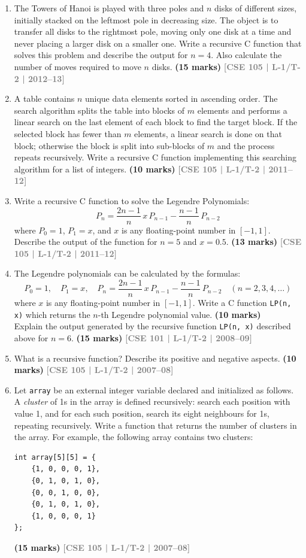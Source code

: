 \documentclass[12pt,a3paper]{article}
\newcommand{\yr}[1]{\hfill\textcolor{gray}{\small\textbf{[#1]}}}
\newcommand{\mk}[1]{\textcolor{orange!70!black}{\small\textbf{(#1 marks)}}}
\begin{document}
\begin{enumerate}
\item The Towers of Hanoi is played with three poles and $n$ disks of different sizes, initially stacked on the leftmost pole in decreasing size. The object is to transfer all disks to the rightmost pole, moving only one disk at a time and never placing a larger disk on a smaller one. Write a recursive C function that solves this problem and describe the output for $n = 4$. Also calculate the number of moves required to move $n$ disks.
\mk{15} \yr{CSE 105 | L-1/T-2 | 2012--13}

\item A table contains $n$ unique data elements sorted in ascending order. The search algorithm splits the table into blocks of $m$ elements and performs a linear search on the last element of each block to find the target block. If the selected block has fewer than $m$ elements, a linear search is done on that block; otherwise the block is split into sub-blocks of $m$ and the process repeats recursively. Write a recursive C function implementing this searching algorithm for a list of integers.
\mk{10} \yr{CSE 105 | L-1/T-2 | 2011--12}

\item Write a recursive C function to solve the Legendre Polynomials:
\[ P_n = \frac{2n-1}{n}\,x\,P_{n-1} - \frac{n-1}{n}\,P_{n-2} \]
where $P_0 = 1$, $P_1 = x$, and $x$ is any floating-point number in $[-1, 1]$. Describe the output of the function for $n = 5$ and $x = 0.5$.
\mk{13} \yr{CSE 105 | L-1/T-2 | 2011--12}

\item The Legendre polynomials can be calculated by the formulas:
\[P_0 = 1,\quad P_1 = x,\quad P_n = \frac{2n-1}{n}\,x\,P_{n-1} - \frac{n-1}{n}\,P_{n-2}\quad (n=2,3,4,\ldots)\]
where $x$ is any floating-point number in $[-1,1]$. Write a C function \texttt{LP(n, x)} which returns the $n$-th Legendre polynomial value.
\mk{10} 
\\ Explain the output generated by the recursive function \texttt{LP(n, x)} described above for $n = 6$.
\mk{15} \yr{CSE 101 | L-1/T-2 | 2008--09}

\item What is a recursive function? Describe its positive and negative aspects.
\mk{10} \yr{CSE 105 | L-1/T-2 | 2007--08}

\item Let \texttt{array} be an external integer variable declared and initialized as follows. A \textit{cluster} of 1s in the array is defined recursively: search each position with value 1, and for each such position, search its eight neighbours for 1s, repeating recursively. Write a function that returns the number of clusters in the array. For example, the following array contains two clusters:
\begin{lstlisting}
int array[5][5] = {
    {1, 0, 0, 0, 1},
    {0, 1, 0, 1, 0},
    {0, 0, 1, 0, 0},
    {0, 1, 0, 1, 0},
    {1, 0, 0, 0, 1}
};
\end{lstlisting}
\mk{15} \yr{CSE 105 | L-1/T-2 | 2007--08}


\end{enumerate}
\end{document}
